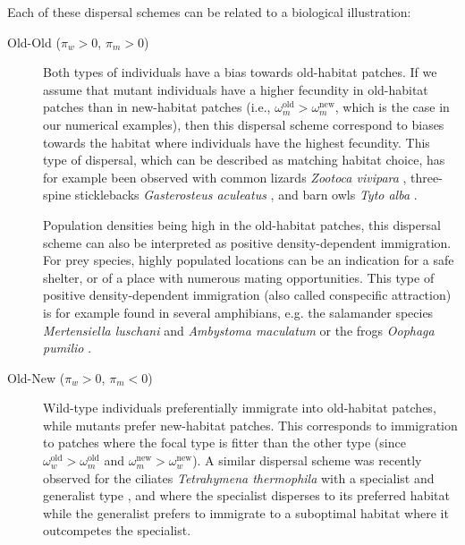 \documentclass[11pt]{article}
\begin{document}
Each of these dispersal schemes can be related to a biological illustration:

\begin{description}
	\item[Old-Old ($\pi_w>0$, $\pi_m>0$)] Both types of individuals have a bias towards old-habitat patches. If we assume that mutant individuals have a higher fecundity in old-habitat patches than in new-habitat patches (i.e., $\omega_m^{\text{old}} > \omega_m^{\text{new}}$, which is the case in our numerical examples), then this dispersal scheme correspond to biases towards the habitat where individuals have the highest fecundity. This type of dispersal, which can be described as matching habitat choice, has for example been observed with common lizards \textit{Zootoca vivipara} \citep{bestion_2015}, three-spine sticklebacks \textit{Gasterosteus aculeatus} \citep{bolnick_2009}, and barn owls \textit{Tyto alba} \citep{dreiss_2011}. 
	
	Population densities being high in the old-habitat patches, this dispersal scheme can also be interpreted as positive density-dependent immigration. For prey species, highly populated locations can be an indication for a safe shelter, or of a place with numerous mating opportunities. This type of positive density-dependent immigration (also called conspecific attraction) is for example found in several amphibians, e.g. the salamander species \textit{Mertensiella luschani} \citep{gautier_2006} and \textit{Ambystoma maculatum} \citep{greene_2016} or the frogs \textit{Oophaga pumilio} \citep{folt_2018}.
	
	\item[Old-New ($\pi_w>0$, $\pi_m<0$)] Wild-type individuals preferentially immigrate into old-habitat patches, while mutants prefer new-habitat patches. This corresponds to immigration to patches where the focal type is fitter than the other type (since $\omega_w^{\text{old}} >\omega_m^{\text{old}}$ and $\omega_m^{\text{new}} >\omega_w^{\text{new}}$). 
	A similar dispersal scheme was recently observed for the ciliates \textit{Tetrahymena thermophila} with a specialist and generalist type \citep{jacob_2018}, and where the specialist disperses to its preferred habitat while the generalist prefers to immigrate to a suboptimal habitat where it outcompetes the specialist. 
	

\end{description}
\end{document}
